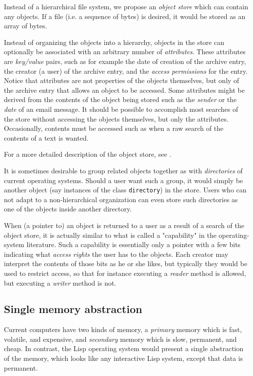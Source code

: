Instead of a hierarchical file system, we propose an \emph{object
  store} which can contain any objects.  If a file (i.e. a
sequence of bytes) is desired, it would be stored as an array of
bytes.

Instead of organizing the objects into a hierarchy, objects in the
store can optionally be associated with an arbitrary number
of \emph{attributes}.  These attributes are \emph{key/value} pairs, such as for
example the date of creation of the archive entry, the creator (a
user) of the archive entry, and the \emph{access permissions} for
the entry.  Notice that attributes are not properties of the objects
themselves, but only of the archive entry that allows an object to
be accessed.  Some attributes might be derived from the contents of the
object being stored such as the \emph{sender} or the \emph{date} of
an email message.  It should be possible to accomplish most searches
of the store without accessing the objects themselves, but only the
attributes.  Occasionally, contents must be accessed such as when a raw
search of the contents of a text is wanted. 

For a more detailed description of the object store, see
. 

It is sometimes desirable to group related objects together as
with \emph{directories} of current operating systems.  Should a user
want such a group, it would simply be another object (say instances
of the class \texttt{directory}) in the store.  Users who can not
adapt to a non-hierarchical organization can even store such
directories as one of the objects inside another directory.

When (a pointer to) an object is returned to a user as a result of a
search of the object store, it is actually similar to what is called
a "capability" in the operating-system literature.  Such a
capability is essentially only a pointer with a few bits indicating
what \emph{access rights} the user has to the objects.  Each creator
may interpret the contents of those bits as he or she likes, but
typically they would be used to restrict access, so that for
instance executing a \emph{reader} method is allowed, but executing
a \emph{writer} method is not.

\subsection{Single memory abstraction}

Current computers have two kinds of memory, a \emph{primary} memory
which is fast, volatile, and expensive, and \emph{secondary} memory
which is slow, permanent, and cheap.  In contrast, the Lisp operating
system would present a single abstraction of the memory, which looks
like any interactive Lisp system, except that data is permanent.

